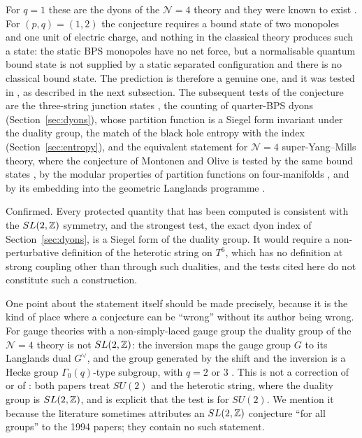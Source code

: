 For $q=1$ these are the dyons of the $\mathcal N=4$ theory and they were known to exist \cite{Osborn79}. For $(p,q) = (1,2)$ the conjecture requires a bound state of two monopoles and one unit of electric charge, and nothing in the classical theory produces such a state: the static BPS monopoles have no net force, but a normalisable quantum bound state is not supplied by a static separated configuration and there is no classical bound state. The prediction is therefore a genuine one, and it was tested in \cite{Sen94dyon}, as described in the next subsection. The subsequent tests of the conjecture are the three-string junction states \cite{Sen98network,Sen07junction}, the counting of quarter-BPS dyons (Section~\ref{sec:dyons}), whose partition function is a Siegel form invariant under the duality group, the match of the black hole entropy with the index (Section~\ref{sec:entropy}), and the equivalent statement for $\mathcal N=4$ super-Yang--Mills theory, where the conjecture of Montonen and Olive \cite{MontonenOlive77} is tested by the same bound states \cite{Sen94dyon,Porrati96,GauntlettLowe96,LeeWeinbergYi96}, by the modular properties of partition functions on four-manifolds \cite{VafaWitten94}, and by its embedding into the geometric Langlands programme \cite{KapustinWitten07}.

\begin{verdict}[claim 1]\label{ver:sl2z}
Confirmed. Every protected quantity that has been computed is consistent with the $SL(2,\mathbb{Z})$ symmetry, and the strongest test, the exact dyon index of Section~\ref{sec:dyons}, is a Siegel form of the duality group.  It would require a non-perturbative definition of the heterotic string on $T^6$, which has no definition at strong coupling other than through such dualities, and the tests cited here do not constitute such a construction.
\end{verdict}

One point about the statement itself should be made precisely, because it is the kind of place where a conjecture can be ``wrong'' without its author being wrong. For gauge theories with a non-simply-laced gauge group the duality group of the $\mathcal N=4$ theory is not $SL(2,\mathbb{Z})$: the inversion maps the gauge group $G$ to its Langlands dual $G^\vee$, and the group generated by the shift and the inversion is a Hecke group $\Gamma_0(q)$-type subgroup, with $q=2$ or $3$ \cite{GGPZ95,DFHK96,AKS06}. This is not a correction of \cite{Sen94duality} or of \cite{Sen94dyon}: both papers treat $SU(2)$ and the heterotic string, where the duality group is $SL(2,\mathbb{Z})$, and \cite{Sen94dyon} is explicit that the test is for $SU(2)$. We mention it because the literature sometimes attributes an $SL(2,\mathbb{Z})$ conjecture ``for all groups'' to the 1994 papers; they contain no such statement.

